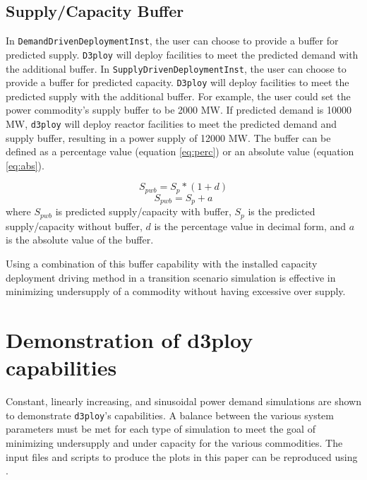 \documentclass{anstrans}
\newcommand{\deploy}{\texttt{d3ploy}\xspace}%
\newcommand{\Deploy}{\texttt{D3ploy}\xspace}%
\begin{document}
\subsection{\textbf{Supply/Capacity Buffer}}
In \texttt{DemandDrivenDeploymentInst}, the user can choose to provide a
buffer for predicted supply.
\Deploy will deploy facilities to meet the predicted demand with the 
additional buffer. 
In \texttt{SupplyDrivenDeploymentInst}, the user can choose to 
provide a buffer for predicted capacity.
\Deploy will deploy facilities to meet the predicted supply with the 
additional buffer. 
For example, the user could set the power commodity's supply buffer 
to be 2000 MW. 
If predicted demand is 10000 MW, \deploy will deploy reactor 
facilities to meet the predicted demand and supply buffer, resulting 
in a power supply of 12000 MW. 
The buffer can be defined as a percentage value (equation \ref{eq:perc}) 
or an absolute value (equation \ref{eq:abs}).  

\begin{equation}
    \label{eq:perc}
    S_{pwb} = S_{p}*(1+d)
\end{equation}
\begin{equation}
    \label{eq:abs}
    S_{pwb} = S_{p}+a
\end{equation}
where $S_{pwb}$ is predicted supply/capacity with buffer, 
$S_p$ is the predicted supply/capacity without buffer, 
$d$ is the percentage value in decimal form, 
and $a$ is the absolute value of the buffer. 

Using a combination of this buffer capability with the 
installed capacity deployment driving method in a transition 
scenario simulation is effective in minimizing undersupply of a 
commodity without having excessive over supply. 

\section{Demonstration of d3ploy capabilities}
Constant, linearly increasing, and sinusoidal power demand simulations
are shown to demonstrate \deploy's capabilities. 
A balance between the various system parameters must be 
met for each type of simulation to meet the goal of 
minimizing undersupply and under capacity for the various 
commodities. 
The input files and scripts to produce the plots in this paper 
can be reproduced using \cite{d3ploy_doi_2019}. 
\end{document}
